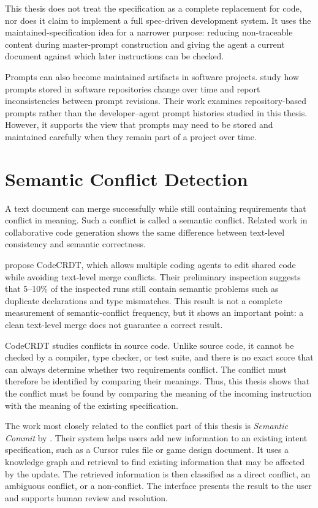 This thesis does not treat the specification as a complete replacement for
code, nor does it claim to implement a full spec-driven development system.
It uses the maintained-specification idea for a narrower purpose: reducing
non-traceable content during master-prompt construction and giving the agent
a current document against which later instructions can be checked.

Prompts can also become maintained artifacts in software projects.
\citet{tafreshipour2025wild} study how prompts stored in software repositories
change over time and report inconsistencies between prompt revisions. Their
work examines repository-based prompts rather than the developer--agent prompt
histories studied in this thesis. However, it supports the view that prompts
may need to be stored and maintained carefully when they remain part of a
project over time.

\section{Semantic Conflict Detection}
\label{sec:related-vc}

A text document can merge successfully while still containing requirements
that conflict in meaning. Such a conflict is called a semantic conflict.
Related work in collaborative code generation shows the same difference 
between text-level consistency and semantic correctness.

\citet{pugachev2025codecrdt} propose CodeCRDT, which allows multiple coding
agents to edit shared code while avoiding text-level merge conflicts.
Their preliminary inspection suggests that 5--10\% of the inspected runs
still contain semantic problems such as duplicate declarations and type
mismatches. This result is not a complete measurement of semantic-conflict
frequency, but it shows an important point: a clean text-level merge
does not guarantee a correct result.

CodeCRDT studies conflicts in source code. Unlike source code, it cannot be checked by a compiler, type checker, or test suite, and there is no exact score that can always determine whether two requirements conflict. The conflict must therefore be identified by comparing their meanings. Thus, this thesis shows that the conflict must be found 
by comparing the meaning of the incoming instruction with the meaning of 
the existing specification.

The work most closely related to the conflict part of this thesis is
\emph{Semantic Commit} by \citet{vaithilingam2025semanticcommit}. Their system
helps users add new information to an existing intent specification, such as a
Cursor rules file or game design document. It uses a knowledge graph and
retrieval to find existing information that may be affected by the update.
The retrieved information is then classified as a direct conflict, an
ambiguous conflict, or a non-conflict. The interface presents the result to
the user and supports human review and resolution.

